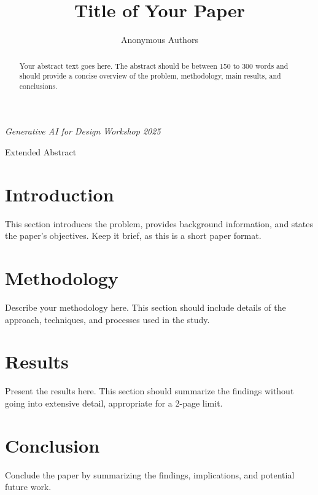 \documentclass[10pt]{article}
\title{Title of Your Paper}
\author{Anonymous Authors}
\date{}
\makeatletter
\renewcommand{\maketitle}{%
    \begin{center}
        \vspace*{0.5cm}
        \Large\@title
        
        \vspace{0.4cm}
        \large\@author
        
        \vspace{0.5cm}
        \normalsize\textit{Generative AI for Design Workshop 2025}
        
        \vspace{0.3cm}
        \normalsize Extended Abstract
        \vspace{0.5cm}
    \end{center}
}
\makeatother
\begin{document}
\maketitle

\begin{abstract}
Your abstract text goes here. The abstract should be between 150 to 300 words and should provide a concise overview of the problem, methodology, main results, and conclusions.
\end{abstract}

\section{Introduction}
This section introduces the problem, provides background information, and states the paper's objectives. Keep it brief, as this is a short paper format.

\section{Methodology}
Describe your methodology here. This section should include details of the approach, techniques, and processes used in the study.

\section{Results}
Present the results here. This section should summarize the findings without going into extensive detail, appropriate for a 2-page limit.

\section{Conclusion}
Conclude the paper by summarizing the findings, implications, and potential future work.



\end{document}
